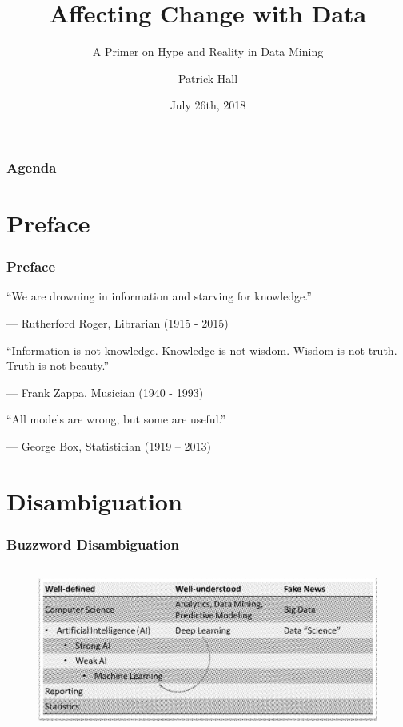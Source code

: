 \documentclass[11pt,
               aspectratio=169
               ]{beamer}
\author{Patrick Hall}
\title{Affecting Change with Data}
\subtitle{A Primer on Hype and Reality in Data Mining}
\institute{\href{https://www.h2o.ai}{H\textsubscript{2}O.ai}}
\date{July 26th, 2018}
\begin{document}
	
	\maketitle
	
	\begin{frame}
	
		\frametitle{Agenda}
	
		\tableofcontents{}
	
	\end{frame}

	\section*{Preface}

		\begin{frame}

			\frametitle{Preface}

			\epigraph{“We are drowning in information and starving for knowledge.”}{--- \textup{Rutherford Roger}, Librarian (1915 - 2015)}

			\epigraph{“Information is not knowledge. Knowledge is not wisdom. Wisdom is not truth. Truth is not beauty.”}{--- \textup{Frank Zappa}, Musician (1940 - 1993)}

			\epigraph{“All models are wrong, but some are useful.”}{--- \textup{George Box}, Statistician (1919 – 2013)}

		\end{frame}

	\section{Disambiguation}
	
		\begin{frame}[t]
		
			\frametitle{Buzzword Disambiguation}
			
			\begin{figure}[htb]
				\begin{center}
					\includegraphics[height=155pt, angle=1]{img/buzzwords.png}
					\label{fig:buzzwords}
				\end{center}
			\end{figure}
		
		\end{frame}
	
\end{document}
